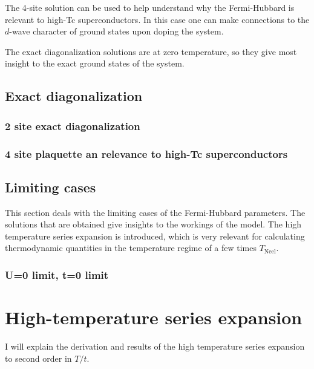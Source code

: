\documentclass[oneside,11pt]{memoir}
\begin{document}
The 4-site solution can be used to help understand why the Fermi-Hubbard is
relevant to high-Tc superconductors.   In this case one can make connections to
the $d$-wave character of ground states upon doping the system.   

The exact diagonalization solutions are at zero temperature, so they give most
insight to the exact ground states of the system. 

\subsection{ Exact diagonalization } 
\subsubsection { 2 site exact diagonalization } 
\subsubsection { 4 site plaquette an relevance to high-Tc superconductors}

\subsection{ Limiting cases} 

This section deals with the limiting cases of the Fermi-Hubbard parameters.
The solutions that are obtained give insights to the workings of the model.
The high temperature series expansion is introduced, which is very relevant for
calculating thermodynamic quantities in the temperature regime of a few times
$T_{\mathrm{Neel}}$.  

\subsubsection { U=0 limit, t=0 limit }


\section{ High-temperature series expansion } I will explain the derivation and
results of the high temperature series expansion to second order in $T/t$. 
\end{document}
